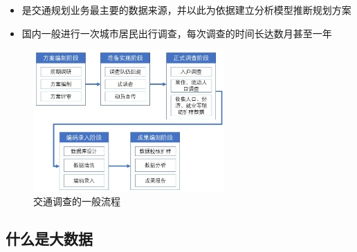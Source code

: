 \documentclass{beamerthemeMono}
\begin{document}
\begin{frame}[t]{\subsecname}
\begin{itemize}
\item {}是交通规划业务最主要的数据来源，并以此为依据建立分析模型推断规划方案
\item 国内一般进行一次城市居民出行调查，每次调查的时间长达数月甚至一年
\end{itemize}

\begin{figure}
  \centering
  \includegraphics[width=0.65\textwidth]{chp01_交通调查.jpg}
  \caption{交通调查的一般流程}
\end{figure}
\end{frame}

\subsection{什么是大数据}
\end{document}
